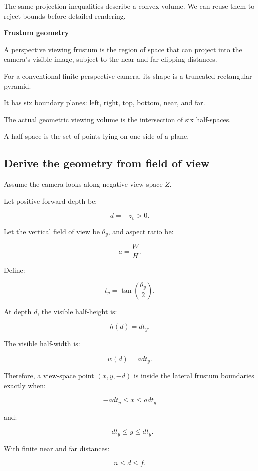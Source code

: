The same projection inequalities describe a convex volume. We can reuse them to reject bounds before detailed rendering.

\textbf{Frustum geometry}

A perspective viewing frustum is the region of space that can project into the camera's visible image, subject to the near and far clipping distances.

For a conventional finite perspective camera, its shape is a truncated rectangular pyramid.

It has six boundary planes: left, right, top, bottom, near, and far.

The actual geometric viewing volume is the intersection of six half-spaces.

A half-space is the set of points lying on one side of a plane.

\subsection{Derive the geometry from field of view}\label{02-foundations-ii-ch034-derive-the-geometry-from-field-of-view}

\hypertarget{02-foundations-ii-ch034-derive-the-geometry-from-field-of-view}{}

Assume the camera looks along negative view-space \(Z\).

Let positive forward depth be:

\[
 d=-z_v>0.
\]

Let the vertical field of view be \(\theta_y\), and aspect ratio be:

\[
 a=\frac WH.
\]

Define:

\[
 t_y=\tan\left(\frac{\theta_y}{2}\right).
\]

At depth \(d\), the visible half-height is:

\[
 \boxed{h(d)=dt_y}.
\]

The visible half-width is:

\[
 \boxed{w(d)=ad t_y}.
\]

Therefore, a view-space point \((x,y,-d)\) is inside the lateral frustum boundaries exactly when:

\[
 \boxed{-ad t_y\le x\le ad t_y}
\]

and:

\[
 \boxed{-dt_y\le y\le dt_y}.
\]

With finite near and far distances:

\[
 \boxed{n\le d\le f}.
\]

